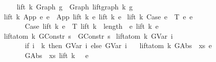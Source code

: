 \begin{isabellebody}
\isanewline
\ \ \isanewline
\ \ {\isachardoublequoteopen}lift\ k\ {\isacharparenleft}{\kern0pt}Graph\ g{\isacharparenright}{\kern0pt}\ {\isacharequal}{\kern0pt}\ Graph\ {\isacharparenleft}{\kern0pt}lift{\isacharunderscore}{\kern0pt}graph\ k\ g{\isacharparenright}{\kern0pt}{\isachardoublequoteclose}\isanewline
{\isacharbar}{\kern0pt}\ {\isachardoublequoteopen}lift\ k\ {\isacharparenleft}{\kern0pt}App\ e{}\ e{}{\isacharparenright}{\kern0pt}\ {\isacharequal}{\kern0pt}\ App\ {\isacharparenleft}{\kern0pt}lift\ k\ e{}{\isacharparenright}{\kern0pt}\ {\isacharparenleft}{\kern0pt}lift\ k\ e{}{\isacharparenright}{\kern0pt}{\isachardoublequoteclose}\isanewline
{\isacharbar}{\kern0pt}\ {\isachardoublequoteopen}lift\ k\ {\isacharparenleft}{\kern0pt}Case\ e\ {\isasymGamma}\ T\ e{}\ e{}{\isacharparenright}{\kern0pt}\ {\isacharequal}{\kern0pt}\isanewline
\ \ \ \ \ \ \ Case\ {\isacharparenleft}{\kern0pt}lift\ k\ e{\isacharparenright}{\kern0pt}\ {\isasymGamma}\ T\ {\isacharparenleft}{\kern0pt}lift\ {\isacharparenleft}{\kern0pt}k\ {\isacharplus}{\kern0pt}\ length\ {\isasymGamma}{\isacharparenright}{\kern0pt}\ e{}{\isacharparenright}{\kern0pt}\ {\isacharparenleft}{\kern0pt}lift\ k\ e{}{\isacharparenright}{\kern0pt}{\isachardoublequoteclose}\isanewline
\isanewline
\ \ \isanewline
{\isacharbar}{\kern0pt}\ {\isachardoublequoteopen}lift{\isacharunderscore}{\kern0pt}atom\ k\ {\isacharparenleft}{\kern0pt}GConstr\ s{\isacharparenright}{\kern0pt}\ {\isacharequal}{\kern0pt}\ GConstr\ s{\isachardoublequoteclose}\isanewline
{\isacharbar}{\kern0pt}\ {\isachardoublequoteopen}lift{\isacharunderscore}{\kern0pt}atom\ k\ {\isacharparenleft}{\kern0pt}GVar\ i{\isacharparenright}{\kern0pt}\ {\isacharequal}{\kern0pt}\isanewline
\ \ \ \ \ \ \ {\isacharparenleft}{\kern0pt}if\ i\ {\isacharless}{\kern0pt}\ k\ then\ GVar\ i\ else\ GVar\ {\isacharparenleft}{\kern0pt}i\ {\isacharplus}{\kern0pt}\ {}{\isacharparenright}{\kern0pt}{\isacharparenright}{\kern0pt}{\isachardoublequoteclose}\isanewline
{\isacharbar}{\kern0pt}\ {\isachardoublequoteopen}lift{\isacharunderscore}{\kern0pt}atom\ k\ {\isacharparenleft}{\kern0pt}GAbs\ {\isasymtau}\ xs\ e{\isacharparenright}{\kern0pt}\ {\isacharequal}{\kern0pt}\isanewline
\ \ \ \ \ \ \ GAbs\ {\isasymtau}\ xs\ {\isacharparenleft}{\kern0pt}lift\ {\isacharparenleft}{\kern0pt}k\ {\isacharplus}{\kern0pt}\ {}{\isacharparenright}{\kern0pt}\ e{\isacharparenright}{\kern0pt}{\isachardoublequoteclose}\isanewline
\isanewline
\ \ \isanewline

\end{isabellebody}
